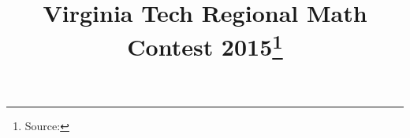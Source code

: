 \documentclass[10pt]{article}
\begin{document}
\title{Virginia Tech Regional Math Contest 2015\footnote{Source: \source}}
\author{\vspace{-2ex}}
\date{\vspace{-6ex}} %
\maketitle







\end{document}
